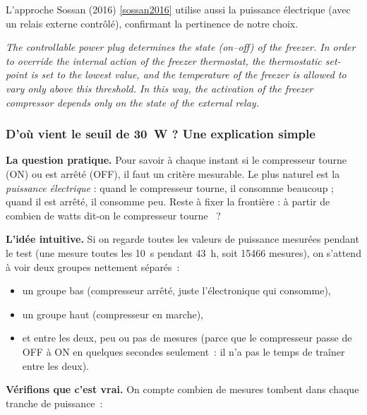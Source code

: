 \documentclass[11pt,a4paper]{article}
\begin{document}
L'approche Sossan (2016) \ref{sossan2016} utilise aussi la puissance électrique (avec un
relais externe contrôlé), confirmant la pertinence de notre choix.

\begin{tcolorbox}[breakable,enhanced jigsaw,colback=yellow!10,colframe=yellow!50!black,boxrule=0.4pt,arc=2pt,
title=\textbf{Extrait textuel — Sossan et~al.\ (2016) \ref{sossan2016}, section 2}]
\og{} \emph{The controllable power plug determines the state (on--off) of the freezer.
In order to override the internal action of the freezer thermostat, the thermostatic
set-point is set to the lowest value, and the temperature of the freezer is allowed to
vary only above this threshold. In this way, the activation of the freezer compressor
depends only on the state of the external relay.} \fg{}
\end{tcolorbox}

\subsubsection*{D'où vient le seuil de \SI{30}{\watt} ? Une explication simple}\label{sec:seuil_30W}

\textbf{La question pratique.} Pour savoir à chaque instant si le compresseur tourne (ON)
ou est arrêté (OFF), il faut un critère mesurable. Le plus naturel est la \emph{puissance
électrique} : quand le compresseur tourne, il consomme beaucoup ; quand il est arrêté, il
consomme peu. Reste à fixer la frontière : à partir de combien de watts dit-on \og{} le
compresseur tourne \fg{}~?

\textbf{L'idée intuitive.} Si on regarde toutes les valeurs de puissance mesurées pendant
le test (une mesure toutes les \SI{10}{\second} pendant \SI{43}{\hour}, soit
\num{15466} mesures), on s'attend à voir deux groupes nettement séparés~:
\begin{itemize}[itemsep=2pt]
\item un groupe \og{} bas \fg{} (compresseur arrêté, juste l'électronique qui consomme),
\item un groupe \og{} haut \fg{} (compresseur en marche),
\item et entre les deux, peu ou pas de mesures (parce que le compresseur passe de OFF à
ON en quelques secondes seulement~: il n'a pas le temps de \og{} traîner \fg{} entre les
deux).
\end{itemize}

\textbf{Vérifions que c'est vrai.} On compte combien de mesures tombent dans chaque
tranche de puissance~:
\end{document}
